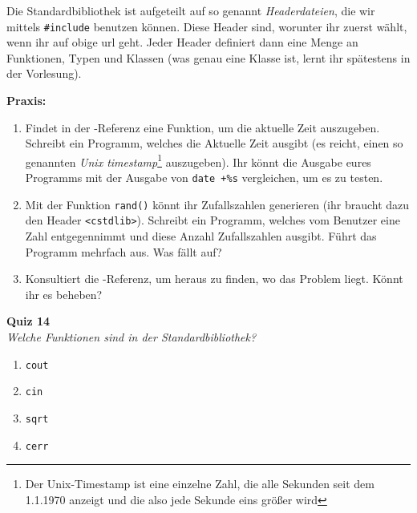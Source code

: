 Die Standardbibliothek ist aufgeteilt auf so genannt \emph{Headerdateien}, die
wir mittels \texttt{\#include} benutzen können. Diese Header sind, worunter ihr
zuerst wählt, wenn ihr auf obige url geht. Jeder Header definiert dann eine
Menge an Funktionen, Typen und Klassen (was genau eine Klasse ist, lernt ihr
spätestens in der Vorlesung).

\textbf{Praxis:}
\begin{enumerate}
	\item Findet in der \Cpp-Referenz eine Funktion, um die aktuelle Zeit
		auszugeben. Schreibt ein Programm, welches die Aktuelle Zeit ausgibt
		(es reicht, einen so genannten \emph{Unix timestamp}\footnote{Der
		Unix-Timestamp ist eine einzelne Zahl, die alle Sekunden seit dem
	1.1.1970 anzeigt und die also jede Sekunde eins größer wird} auszugeben).
	Ihr könnt die Ausgabe eures Programms mit der Ausgabe von \texttt{date
		+\%s} vergleichen, um es zu testen.
    \item Mit der Funktion \texttt{rand()} könnt ihr Zufallszahlen generieren
        (ihr braucht dazu den Header \texttt{<cstdlib>}). Schreibt ein
        Programm, welches vom Benutzer eine Zahl entgegennimmt und diese Anzahl
        Zufallszahlen ausgibt. Führt das Programm mehrfach aus. Was fällt auf?
    \item Konsultiert die \Cpp-Referenz, um heraus zu finden, wo das Problem
        liegt. Könnt ihr es beheben?
\end{enumerate}

\textbf{Quiz 14}\\
\textit{Welche Funktionen sind in der Standardbibliothek?}
\begin{enumerate}[label=\alph]
    \item \texttt{cout}
    \item \texttt{cin}
    \item \texttt{sqrt}
    \item \texttt{cerr}
\end{enumerate}

